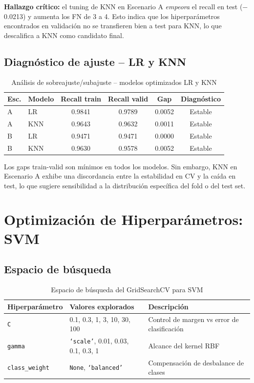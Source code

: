 \documentclass[11pt,a4paper]{article}
\begin{document}
\textbf{Hallazgo crítico:} el tuning de KNN en Escenario A \textit{empeora} el recall en test ($-$0.0213) y aumenta los FN de 3 a 4. Esto indica que los hiperparámetros encontrados en validación no se transfieren bien a test para KNN, lo que descalifica a KNN como candidato final.

\subsection{Diagnóstico de ajuste -- LR y KNN}

\begin{table}[H]
\centering
\caption{Análisis de sobreajuste/subajuste -- modelos optimizados LR y KNN}
\renewcommand{\arraystretch}{1.15}
\begin{tabular}{llcccc}
\toprule
\textbf{Esc.} & \textbf{Modelo} & \textbf{Recall train} & \textbf{Recall valid} & \textbf{Gap} & \textbf{Diagnóstico} \\
\midrule
A & LR & 0.9841 & 0.9789 & 0.0052 & Estable \\
A & KNN & 0.9643 & 0.9632 & 0.0011 & Estable \\
B & LR & 0.9471 & 0.9471 & 0.0000 & Estable \\
B & KNN & 0.9630 & 0.9578 & 0.0052 & Estable \\
\bottomrule
\end{tabular}
\end{table}

Los gaps train-valid son mínimos en todos los modelos. Sin embargo, KNN en Escenario A exhibe una discordancia entre la estabilidad en CV y la caída en test, lo que sugiere sensibilidad a la distribución específica del fold o del test set.

\section{Optimización de Hiperparámetros: SVM}

\subsection{Espacio de búsqueda}

\begin{table}[H]
\centering
\caption{Espacio de búsqueda del GridSearchCV para SVM}
\begin{tabular}{lll}
\toprule
\textbf{Hiperparámetro} & \textbf{Valores explorados} & \textbf{Descripción} \\
\midrule
\texttt{C} & 0.1, 0.3, 1, 3, 10, 30, 100 & Control de margen vs error de clasificación \\
\texttt{gamma} & \texttt{`scale'}, 0.01, 0.03, 0.1, 0.3, 1 & Alcance del kernel RBF \\
\texttt{class\_weight} & \texttt{None}, \texttt{`balanced'} & Compensación de desbalance de clases \\
\bottomrule
\end{tabular}
\end{table}
\end{document}
